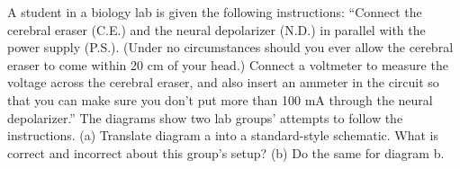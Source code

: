A student in a biology lab is given the following
instructions: ``Connect the cerebral eraser (C.E.) and the
neural depolarizer (N.D.) in parallel with the power supply
(P.S.). (Under no circumstances should you ever allow the
cerebral eraser to come within 20 cm of your head.) Connect
a voltmeter to measure the voltage across the cerebral
eraser, and also insert an ammeter in the circuit so that
you can make sure you don't put more than 100 mA through the
neural depolarizer.'' The diagrams show two lab groups'
attempts to follow the instructions. (a) Translate diagram
a into a standard-style schematic. What is correct and
incorrect about this group's setup? (b) Do the same for diagram b.
